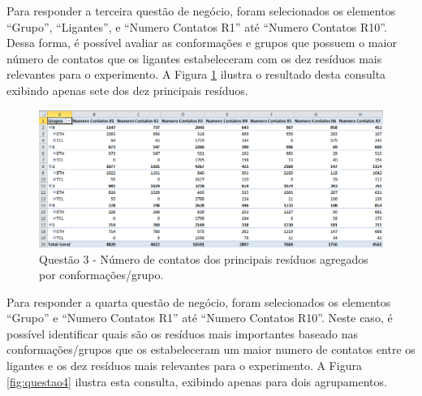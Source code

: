 Para responder a terceira questão de negócio, foram selecionados os elementos ``Grupo'', ``Ligantes'', e ``Numero Contatos R1'' até ``Numero Contatos R10''. Dessa forma, é possível avaliar as conformações e grupos que possuem o maior número de contatos que os ligantes estabeleceram com os dez resíduos mais relevantes para o experimento. A Figura \ref{fig:questao3} ilustra o resultado desta consulta exibindo apenas sete dos dez principais resíduos.

\begin{figure}[h]
        \center
        \includegraphics[scale=0.58]{images/Questao3.PNG}
        \caption{Questão 3 - Número de contatos dos principais resíduos agregados por conformações/grupo.}
        \label{fig:questao3}
\end{figure}

Para responder a quarta questão de negócio, foram selecionados os elementos ``Grupo'' e ``Numero Contatos R1'' até ``Numero Contatos R10''. Neste caso, é possível identificar quais são os resíduos mais importantes baseado nas conformações/grupos que os estabeleceram um maior numero de contatos entre os ligantes e os dez resíduos mais relevantes para o experimento. A Figura \ref{fig:questao4} ilustra esta consulta, exibindo apenas para dois agrupamentos. 

